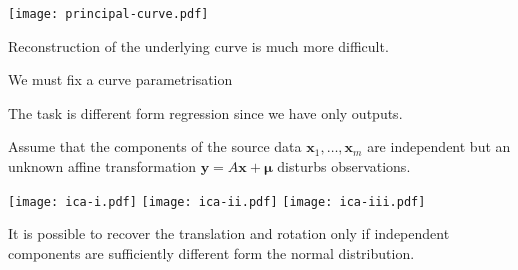 \documentclass[landscape,footrule]{foils}
\renewcommand{\vec}[1]{\boldsymbol{#1}}
\begin{document}

\begin{center}
\texttt{[image: principal-curve.pdf]}
\end{center}\vspace*{-1cm}

Reconstruction of the underlying curve is much more difficult.
\begin{triangles}
\item We must fix a curve parametrisation 
\item The task is different form regression since we have only outputs.
\end{triangles} 
 



Assume that the components of the source data $\vec{x}_1,\ldots,\vec{x}_m$ are independent  
but an unknown affine transformation  $\vec{y}=A\vec{x}+\vec{\mu}$ disturbs observations. 
\begin{center}
\texttt{[image: ica-i.pdf]}
\texttt{[image: ica-ii.pdf]}
\texttt{[image: ica-iii.pdf]}
\end{center}\vspace*{-1cm}

It is possible to recover the translation and rotation only if independent components are sufficiently different form the normal distribution.  
\end{document}
